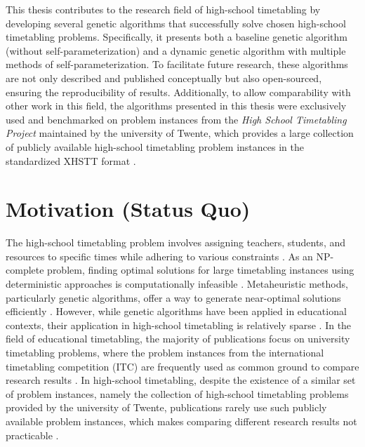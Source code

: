 \documentclass[english,examples]{isasthesis}
\begin{document}
This thesis contributes to the research field of high-school timetabling by
developing several genetic algorithms that successfully solve chosen
high-school timetabling problems.
Specifically, it presents both a baseline genetic algorithm (without
self-parameterization) and a dynamic genetic algorithm with multiple methods
of self-parameterization.
To facilitate future research, these algorithms are not only described and
published conceptually but also open-sourced, ensuring the reproducibility of
results.
Additionally, to allow comparability with other work in this field, the
algorithms presented in this thesis were exclusively used and benchmarked on
problem instances from the \textit{High School Timetabling Project} maintained
by the university of Twente, which provides a large collection of publicly
available high-school timetabling problem instances in the standardized
XHSTT format \cite{xhsttTwenteWeb,xhsttDocs}.


\section{Motivation (Status Quo)}
The high-school timetabling problem involves assigning teachers, students, and
resources to specific times while adhering to various constraints
\cite{Ceschia2023}.
As an NP-complete problem, finding optimal solutions for large timetabling
instances using deterministic approaches is computationally infeasible
\cite{Beligiannis2008,Pillay2014}.
Metaheuristic methods, particularly genetic algorithms, offer a way to generate
near-optimal solutions efficiently \cite{Affenzeller2009}.
%
However, while genetic algorithms have been applied in educational
contexts, their application in high-school timetabling is relatively sparse
\cite{quaer2024survey}.
In the field of educational timetabling, the majority of publications
focus on university timetabling problems, where the problem instances from the
international timetabling competition (ITC) are frequently used as common
ground to compare research results \cite{Ceschia2023,van2023multi,Tan2021}.
%
In high-school timetabling, despite the existence of a similar set of problem
instances, namely the collection of high-school timetabling problems provided
by the university of Twente, publications rarely use such publicly available
problem instances, which makes comparing different research results not
practicable \cite{quaer2024survey}.
\end{document}
